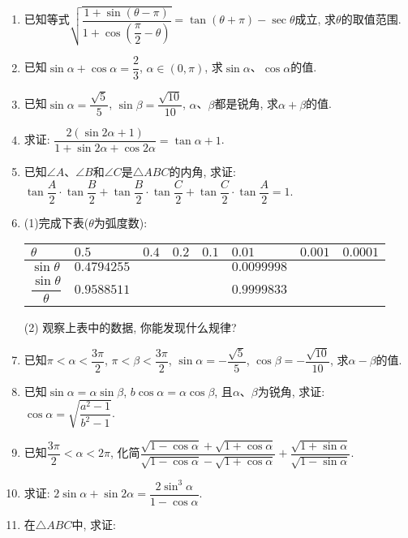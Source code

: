 \documentclass[10pt,a4paper]{article}
\begin{document}
\begin{enumerate}[1.]
\item 已知等式$\sqrt {\dfrac{1+\sin (\theta -\pi)}{1+\cos (\dfrac{\pi}2-\theta)}}=\tan (\theta +\pi)-\sec \theta$成立, 求$\theta$的取值范围.
\item 已知$\sin \alpha +\cos \alpha =\dfrac 23$, $\alpha \in (0,\pi)$, 求$\sin \alpha$、$\cos \alpha$的值.
\item 已知$\sin \alpha =\dfrac{\sqrt 5}5$, $\sin \beta =\dfrac{\sqrt {10}}{10}$, $\alpha$、$\beta$都是锐角, 求$\alpha +\beta$的值.
\item 求证: $\dfrac{2(\sin 2\alpha +1)}{1+\sin 2\alpha +\cos 2\alpha}=\tan \alpha +1$.
\item 已知$\angle A$、$\angle B$和$\angle C$是$\triangle ABC$的内角,
求证: $\tan \dfrac A2\cdot \tan \dfrac B2+\tan \dfrac B2\cdot \tan \dfrac C2+\tan \dfrac C2\cdot \tan \dfrac A2=1$.
\item (1)完成下表($\theta$为弧度数):
\begin{center}
    \begin{tabular}{|p{}<{\centering}|p{}<{\centering}|p{}<{\centering}|p{}<{\centering}|p{}<{\centering}|p{}<{\centering}|p{}<{\centering}|p{}<{\centering}|}
        \hline
        $\theta$ & $0.5$ & $0.4$ & $0.2$ & $0.1$ & $0.01$ & $0.001$ & $0.0001$\\ \hline
        $\sin \theta$ & $0.4794255$	& & & &	$0.0099998$ & & \\ \hline
        $\dfrac{\sin \theta}\theta$ & $0.9588511$	& & & &	$0.9999833$ & & \\ \hline
    \end{tabular}
\end{center}	
(2) 观察上表中的数据, 你能发现什么规律?
\item 已知$\pi <\alpha <\dfrac{3\pi}2$, $\pi <\beta <\dfrac{3\pi}2$, $\sin \alpha =-\dfrac{\sqrt 5}5$, $\cos \beta =-\dfrac{\sqrt {10}}{10}$, 求$\alpha -\beta$的值.
\item 已知$\sin \alpha =\alpha \sin \beta$, $b\cos \alpha =\alpha \cos \beta$, 且$\alpha$、$\beta$为锐角, 求证: $\cos \alpha =\sqrt {\dfrac{a^2-1}{b^2-1}}$.
\item 已知$\dfrac{3\pi}2<\alpha <2\pi$, 化简$\dfrac{\sqrt {1-\cos \alpha}+\sqrt {1+\cos \alpha}}{\sqrt {1-\cos \alpha}-\sqrt {1+\cos \alpha}}+\dfrac{\sqrt {1+\sin \alpha}}{\sqrt {1-\sin \alpha}}$.
\item 求证: $2\sin \alpha +\sin 2\alpha =\dfrac{2\sin ^3\alpha}{1-\cos \alpha}$.
\item 在$\triangle ABC$中, 求证:

\end{enumerate}
\end{document}
